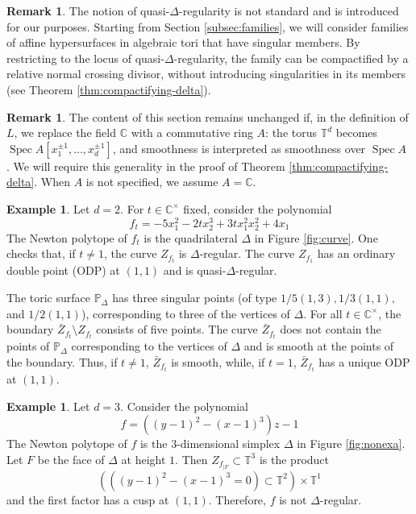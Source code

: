 \documentclass[11pt, reqno]{amsart}
\theoremstyle{plain}
\theoremstyle{definition}
\newtheorem{rem}[thm]{Remark}
\newtheorem{example}[thm]{Example}
\newcommand{\CC}{\mathbb{C}}
\newcommand{\TT}{\mathbb{T}}
\DeclareMathOperator{\Spec}{Spec}
\begin{document}
\begin{rem}
The notion of quasi-$\Delta$-regularity is not standard and is introduced for our purposes. Starting from Section \ref{subsec:families}, we will consider families of affine hypersurfaces in algebraic tori that have singular members. By restricting to the locus of quasi-$\Delta$-regularity, the family can be compactified by a relative normal crossing divisor, without introducing singularities in its members (see Theorem \ref{thm:compactifying-delta}). 
\end{rem}


\begin{rem}
\label{rem:ring}
The content of this section remains unchanged if, in the definition of $L$, we replace the field $\mathbb{C}$ with a commutative ring $A$: the torus $\TT^d$ becomes $\Spec A[x_1^{\pm 1},\dots, x_{d}^{\pm 1}]$, and smoothness is interpreted as smoothness over $\Spec A$ \cite{DL}. 
We will require this generality in the proof of Theorem \ref{thm:compactifying-delta}. When $A$ is not specified, we assume $A=\CC$.
\end{rem}



\begin{example}
\label{exa:curve-ft}
Let $d=2$. For $t \in \CC^\times$ fixed, consider the polynomial 
\begin{equation*}
\label{eq:curve}
f_t=-5x_1^2 -2t  x_2^3+ 3tx_1^2x_2^2+4x_1
\end{equation*}
The Newton polytope of $f_t$ is the quadrilateral $\Delta$ in Figure \ref{fig:curve}. One checks that, if $t \neq 1$, the curve $Z_{f_t}$ is $\Delta$-regular. 
The curve $Z_{f_1}$ has an ordinary double point (ODP) at $(1,1)$ and is quasi-$\Delta$-regular.

The toric surface $\mathbb{P}_\Delta$ has three singular points (of type $1/5{(1,3)}, 1/3{(1,1)},$ and $ 1/2{(1,1)}$), corresponding to three of the vertices of $\Delta$. 
For all $t \in \CC^\times$, the boundary $\bar{Z}_{f_t} \setminus Z_{f_t}$ consists of five points.
The curve $\bar{Z}_{f_t}$ does not contain the points of $\mathbb{P}_\Delta$ corresponding to the vertices of $\Delta$ and is smooth at the points of the boundary. 
Thus, if $t \neq 1$, $\bar{Z}_{f_t}$ is smooth, while, if $t=1$, $\bar{Z}_{f_t}$ has a unique ODP at $(1,1)$.
\end{example}


\begin{example}
    \label{exa:nonexa}
    Let $d=3$. Consider the polynomial
    \[
    f=((y-1)^2-(x-1)^3)z-1
    \]
    The Newton polytope of $f$ is the $3$-dimensional simplex $\Delta$ in Figure \ref{fig:nonexa}. 
    Let $F$ be the face of $\Delta$ at height $1$. 
    Then $Z_{f_{|F}} \subset \TT^3$ is 
    the product \[
    \left(((y-1)^2-(x-1)^3=0) \subset \TT^2 \right)\times \TT^1 
    \]
    and the first factor has a cusp at $(1,1)$. Therefore, $f$ is not $\Delta$-regular.
\end{example}
\end{document}
